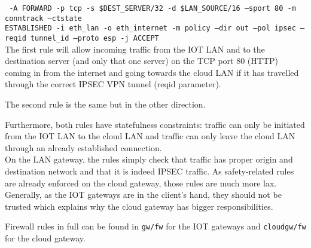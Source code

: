 \documentclass[paper=a4, fontsize=11pt]{scrartcl}
\begin{document}
\texttt{%
    -A FORWARD -p tcp -s \$DEST\_SERVER/32 -d \$LAN\_SOURCE/16 --sport 80 -m
    conntrack --ctstate \\ESTABLISHED -i eth\_lan -o eth\_internet -m policy --dir
    out --pol ipsec --reqid tunnel\_id --proto esp -j ACCEPT
}
\\

The first rule will allow incoming traffic from the IOT LAN and to the
destination server (and only that one server) on the TCP port 80 (HTTP) coming
in from the internet and going towards the cloud LAN if it has travelled
through the correct IPSEC VPN tunnel (reqid parameter).

The second rule is the same but in the other direction.

Furthermore, both rules have statefulness constraints: traffic can only be
initiated from the IOT LAN to the cloud LAN and traffic can only leave the cloud
LAN through an already established connection.
\\

On the LAN gateway, the rules simply check that traffic has proper origin and
destination network and that it is indeed IPSEC traffic.
As safety-related rules are already enforced on the cloud gateway, those rules
are much more lax.
Generally, as the IOT gateways are in the client's hand, they should not be
trusted which explains why the cloud gateway has bigger responsibilities.

Firewall rules in full can be found in \texttt{gw/fw} for the IOT gateways and
\texttt{cloudgw/fw} for the cloud gateway.
\end{document}
